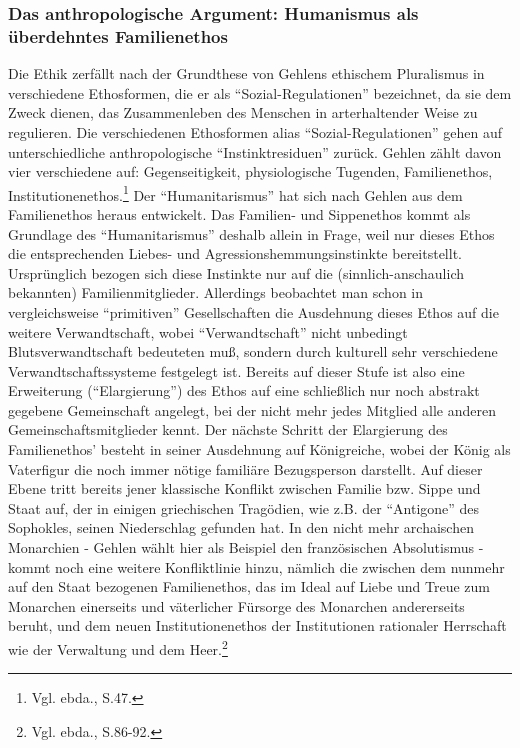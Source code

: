 \documentclass[12pt,a4paper]{article}
\begin{document}
\subsubsection{Das anthropologische Argument: Humanismus als überdehntes Familienethos}

Die Ethik zerfällt nach der Grundthese von Gehlens ethischem Pluralismus in
verschiedene Ethosformen, die er als "`Sozial-Regulationen"' bezeichnet, da
sie dem Zweck dienen, das Zusammenleben des Menschen in arterhaltender Weise
zu regulieren. Die verschiedenen Ethosformen alias "`Sozial-Regulationen"'
gehen auf unterschiedliche anthropologische "`Instinktresiduen"' zurück.
Gehlen zählt davon vier verschiedene auf: Gegenseitigkeit, physiologische
Tugenden, Familienethos, Institutionenethos.\footnote{Vgl. ebda., S.47.}
Der "`Humanitarismus"' hat sich nach Gehlen aus dem Familienethos heraus
entwickelt. Das Familien- und Sippenethos kommt als Grundlage des
"`Humanitarismus"' deshalb allein in Frage, weil nur dieses Ethos die
entsprechenden Liebes- und Agressionshemmungsinstinkte bereitstellt.
Ursprünglich bezogen sich diese Instinkte nur auf die (sinnlich-anschaulich
bekannten) Familienmitglieder. Allerdings beobachtet man schon in
vergleichsweise "`primitiven"' Gesellschaften die Ausdehnung dieses Ethos auf
die weitere Verwandtschaft, wobei "`Verwandtschaft"' nicht unbedingt
Blutsverwandtschaft bedeuteten muß, sondern durch kulturell sehr
verschiedene Verwandtschaftssysteme festgelegt ist. Bereits auf dieser Stufe
ist also eine Erweiterung ("`Elargierung"') des Ethos auf eine schließlich
nur noch abstrakt gegebene Gemeinschaft angelegt, bei der nicht mehr jedes
Mitglied alle anderen Gemeinschaftsmitglieder kennt. Der nächste Schritt
der Elargierung des Familienethos' besteht in seiner Ausdehnung auf
Königreiche, wobei der König als Vaterfigur die noch immer nötige
familiäre Bezugsperson darstellt. Auf dieser Ebene tritt bereits jener
klassische Konflikt zwischen Familie bzw. Sippe und Staat auf, der in einigen
griechischen Tragödien, wie z.B. der "`Antigone"' des Sophokles, seinen
Niederschlag gefunden hat. In den nicht mehr archaischen Monarchien -
Gehlen wählt hier als Beispiel den französischen Absolutismus - kommt noch
eine weitere Konfliktlinie hinzu, nämlich die zwischen dem nunmehr auf den
Staat bezogenen Familienethos, das im Ideal auf Liebe und Treue zum Monarchen
einerseits und väterlicher Fürsorge des Monarchen andererseits
beruht, und dem neuen Institutionenethos der Institutionen rationaler
Herrschaft wie der Verwaltung und dem Heer.\footnote{Vgl. ebda., S.86-92.}
\end{document}
